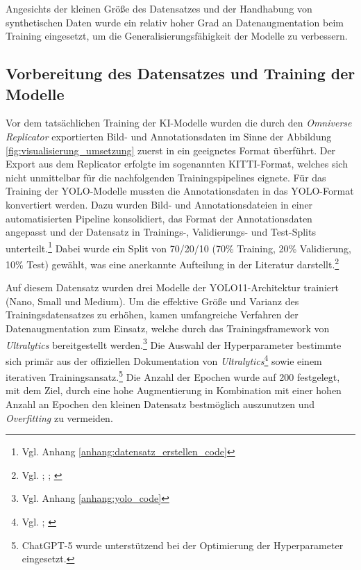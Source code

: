 Angesichts der kleinen Größe des Datensatzes und der Handhabung von synthetischen Daten wurde ein relativ hoher Grad an Datenaugmentation beim Training eingesetzt, um die Generalisierungsfähigkeit der Modelle zu verbessern.

\subsection{Vorbereitung des Datensatzes und Training der Modelle}
Vor dem tatsächlichen Training der \ac{KI}-Modelle wurden die durch den \textit{Omniverse Replicator} exportierten Bild- und Annotationsdaten im Sinne der Abbildung \ref{fig:visualisierung_umsetzung} zuerst in ein geeignetes Format überführt. Der Export aus dem Replicator erfolgte im sogenannten KITTI-Format, welches sich nicht unmittelbar für die nachfolgenden Trainingspipelines eignete. Für das Training der \ac{YOLO}-Modelle mussten die Annotationsdaten in das \ac{YOLO}-Format konvertiert werden. Dazu wurden Bild- und Annotationsdateien in einer automatisierten Pipeline konsolidiert, das Format der Annotationsdaten angepasst und der Datensatz in Trainings-, Validierungs- und Test-Splits unterteilt.\footnote{Vgl. Anhang  \ref{anhang:datensatz_erstellen_code}} Dabei wurde ein Split von 70/20/10 (70\% Training, 20\% Validierung, 10\% Test) gewählt, was eine anerkannte Aufteilung in der Literatur darstellt.\footnote{Vgl. 
\cite[261]{urgo_monitoring_2024}; \cite[3]{griem_synthetic_2025}; \cite[5]{khirodkar_domain_2018}}

Auf diesem Datensatz wurden drei Modelle der YOLO11-Architektur trainiert (Nano, Small und Medium). Um die effektive Größe und Varianz des Trainingsdatensatzes zu erhöhen, kamen umfangreiche Verfahren der Datenaugmentation zum Einsatz, welche durch das Trainingsframework von \textit{Ultralytics} bereitgestellt werden.\footnote{Vgl. Anhang \ref{anhang:yolo_code}} Die Auswahl der Hyperparameter bestimmte sich primär aus der offiziellen Dokumentation von \textit{Ultralytics}\footnote{Vgl. \cite{ultralytics_hyperparameter-optimierung_nodate}; \cite{ultralytics_yolo-datenerweiterung_nodate}} sowie einem iterativen Trainingsansatz.\footnote{ChatGPT-5 wurde unterstützend bei der Optimierung der Hyperparameter eingesetzt.} Die Anzahl der Epochen wurde auf 200 festgelegt, mit dem Ziel, durch eine hohe Augmentierung in Kombination mit einer hohen Anzahl an Epochen den kleinen Datensatz bestmöglich auszunutzen und \textit{Overfitting} zu vermeiden.

